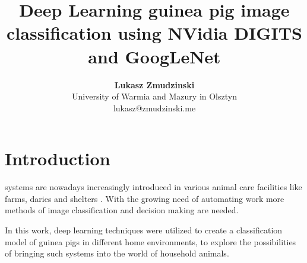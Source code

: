 \documentclass[10pt,journal,compsoc]{IEEEtran}
\begin{document}
    
    \title{Deep Learning guinea pig image classification using NVidia DIGITS and GoogLeNet}
    
    \author{\textbf{Lukasz Zmudzinski} \\ University of Warmia and Mazury in Olsztyn \\ lukasz@zmudzinski.me}
    
    
    
    \maketitle
    \IEEEdisplaynontitleabstractindextext
    \IEEEpeerreviewmaketitle
    \section{Introduction}
    \label{sec:introduction}
    
     systems are nowadays increasingly introduced in various animal care facilities like farms, daries and shelters \cite{agrirobo, dairyrobo}. With the growing need of automating work more methods of image classification and decision making are needed. 

    In this work, deep learning techniques were utilized to create a classification model of guinea pigs in different home environments, to explore the possibilities of bringing such systems into the world of household animals.
    
    
\end{document}
